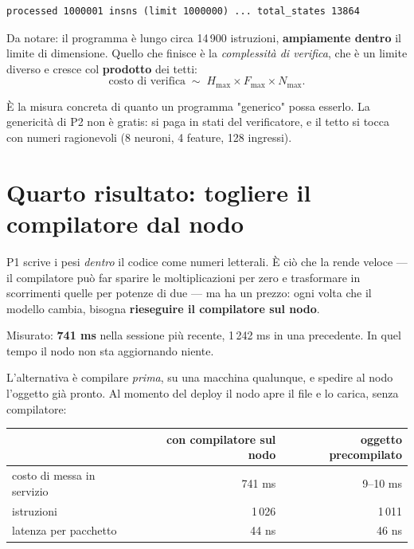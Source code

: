\documentclass[11pt,a4paper,oneside]{report}
\begin{document}
\begin{lstlisting}
processed 1000001 insns (limit 1000000) ... total_states 13864
\end{lstlisting}

Da notare: il programma è lungo circa 14\,900 istruzioni, \textbf{ampiamente
dentro} il limite di dimensione. Quello che finisce è la \emph{complessità di
verifica}, che è un limite diverso e cresce col \textbf{prodotto} dei tetti:
\[
  \text{costo di verifica} \;\sim\; H_{\max} \times F_{\max} \times N_{\max} .
\]

\begin{lezione}
È la misura concreta di quanto un programma "generico" possa esserlo. La
genericità di P2 non è gratis: si paga in stati del verificatore, e il tetto si
tocca con numeri ragionevoli (8 neuroni, 4 feature, 128 ingressi).
\end{lezione}

\section{Quarto risultato: togliere il compilatore dal nodo}

P1 scrive i pesi \emph{dentro} il codice come numeri letterali. È ciò che la
rende veloce --- il compilatore può far sparire le moltiplicazioni per zero e
trasformare in scorrimenti quelle per potenze di due --- ma ha un prezzo: ogni
volta che il modello cambia, bisogna \textbf{rieseguire il compilatore sul nodo}.

Misurato: \textbf{741 ms} nella sessione più recente, 1\,242 ms in una
precedente. In quel tempo il nodo non sta aggiornando niente.

L'alternativa è compilare \emph{prima}, su una macchina qualunque, e spedire al
nodo l'oggetto già pronto. Al momento del deploy il nodo apre il file e lo carica,
senza compilatore:

\begin{center}
\small
\begin{tabular}{@{}lrr@{}}
\toprule
& \textbf{con compilatore sul nodo} & \textbf{oggetto precompilato} \\
\midrule
costo di messa in servizio & 741 ms & 9--10 ms \\
istruzioni & 1\,026 & 1\,011 \\
latenza per pacchetto & 44 ns & 46 ns \\
\bottomrule
\end{tabular}
\end{center}
\end{document}

